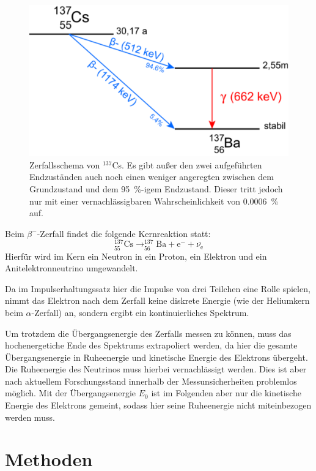 \documentclass[
	a4paper,
	12pt,
	pagesize,
	ngerman
]{scrartcl}
\begin{document}
	\begin{figure}[H]
			\includegraphics[width= 0.6 \linewidth]{img/cs-137-zerfallsschema}
			\caption{
			Zerfallsschema von $^{137}$Cs.
			Es gibt außer den zwei aufgeführten Endzuständen auch noch einen weniger angeregten zwischen dem Grundzustand und dem \SI{95}{\percent}-igem Endzustand.
			Dieser tritt jedoch nur mit einer vernachlässigbaren Wahrscheinlichkeit von \SI{0.0006}{\percent} auf.
			\cite{Leifi}
			}
			\label{fig_Zerfallsschema}
	\end{figure}


		Beim $\beta^-$-Zerfall findet die folgende Kernreaktion statt:
		\begin{equation}
			\label{eq_beta-minus}
			 _{55}^{137}\text{Cs} \rightarrow _{56}^{137}\text{Ba} + \text{e}^- + \bar{\nu_{\text{e}}}
		\end{equation}
		Hierfür wird im Kern ein Neutron in ein Proton, ein Elektron und ein Anitelektronneutrino umgewandelt.

		Da im Impulserhaltungssatz hier die Impulse von drei Teilchen eine Rolle spielen, nimmt das Elektron nach dem Zerfall keine diskrete Energie (wie der Heliumkern beim $\alpha$-Zerfall) an, sondern ergibt ein kontinuierliches Spektrum.

		Um trotzdem die Übergangsenergie des Zerfalls messen zu können, muss das hochenergetiche Ende des Spektrums extrapoliert werden, da hier die gesamte Übergangsenergie in Ruheenergie und kinetische Energie des Elektrons übergeht.
		Die Ruheenergie des Neutrinos muss hierbei vernachlässigt werden. %
		Dies ist aber nach aktuellem Forschungsstand innerhalb der Messunsicherheiten problemlos möglich. %
		Mit der Übergangsenergie $E_0$ ist im Folgenden aber nur die kinetische Energie des Elektrons gemeint, sodass hier seine Ruheenergie nicht miteinbezogen werden muss.



	\section{Methoden}
\end{document}
